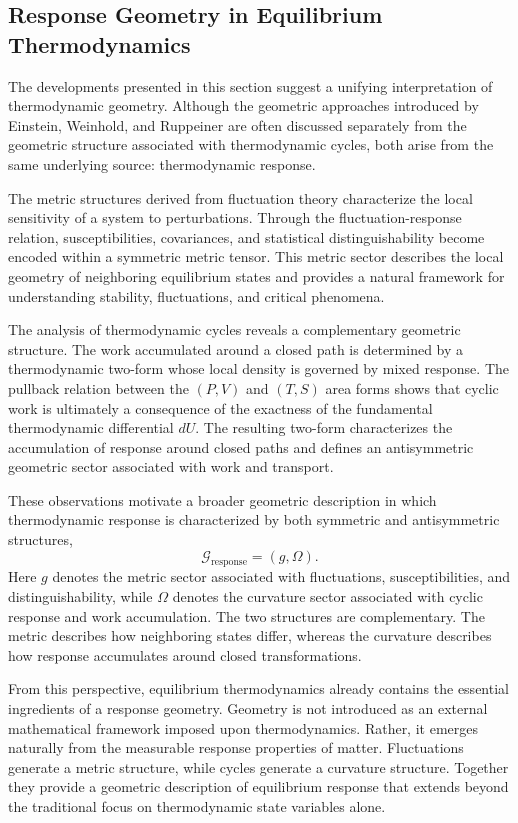 \subsection{Response Geometry in Equilibrium Thermodynamics}

The developments presented in this section suggest a unifying interpretation of thermodynamic geometry. Although the geometric approaches introduced by Einstein, Weinhold, and Ruppeiner are often discussed separately from the geometric structure associated with thermodynamic cycles, both arise from the same underlying source: thermodynamic response.

The metric structures derived from fluctuation theory characterize the local sensitivity of a system to perturbations. Through the fluctuation-response relation, susceptibilities, covariances, and statistical distinguishability become encoded within a symmetric metric tensor. This metric sector describes the local geometry of neighboring equilibrium states and provides a natural framework for understanding stability, fluctuations, and critical phenomena.

The analysis of thermodynamic cycles reveals a complementary geometric structure. The work accumulated around a closed path is determined by a thermodynamic two-form whose local density is governed by mixed response. The pullback relation between the \((P,V)\) and \((T,S)\) area forms shows that cyclic work is ultimately a consequence of the exactness of the fundamental thermodynamic differential \(dU\). The resulting two-form characterizes the accumulation of response around closed paths and defines an antisymmetric geometric sector associated with work and transport.

These observations motivate a broader geometric description in which thermodynamic response is characterized by both symmetric and antisymmetric structures,
\begin{equation}
\boxed{
\mathcal{G}_{\mathrm{response}}
=
(g,\Omega).
}
\end{equation}
Here \(g\) denotes the metric sector associated with fluctuations, susceptibilities, and distinguishability, while \(\Omega\) denotes the curvature sector associated with cyclic response and work accumulation. The two structures are complementary. The metric describes how neighboring states differ, whereas the curvature describes how response accumulates around closed transformations.

From this perspective, equilibrium thermodynamics already contains the essential ingredients of a response geometry. Geometry is not introduced as an external mathematical framework imposed upon thermodynamics. Rather, it emerges naturally from the measurable response properties of matter. Fluctuations generate a metric structure, while cycles generate a curvature structure. Together they provide a geometric description of equilibrium response that extends beyond the traditional focus on thermodynamic state variables alone.

